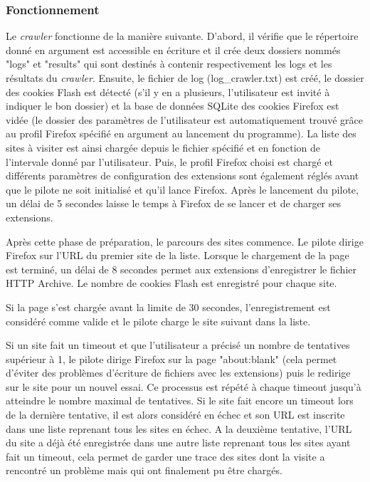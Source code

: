 \subsubsection{Fonctionnement}
Le \textit{crawler} fonctionne de la manière suivante. D'abord, il vérifie que le répertoire donné en argument est accessible en écriture et il crée deux dossiers nommés "logs" et "results" qui sont destinés à contenir respectivement les logs et les résultats du \textit{crawler}. Ensuite, le fichier de log (log\_crawler.txt) est créé, le dossier des cookies Flash est détecté (s'il y en a plusieurs, l'utilisateur est invité à indiquer le bon dossier) et la base de données SQLite des cookies Firefox est vidée (le dossier des paramètres de l'utilisateur est automatiquement trouvé grâce au profil Firefox spécifié en argument au lancement du programme). La liste des sites à visiter est ainsi chargée depuis le fichier spécifié et en fonction de l'intervale donné par l'utilisateur. Puis, le profil Firefox choisi est chargé et différents paramètres de configuration des extensions sont également réglés avant que le pilote ne soit initialisé et qu'il lance Firefox. Après le lancement du pilote, un délai de 5 secondes laisse le temps à Firefox de se lancer et de charger ses extensions.
\newline

Après cette phase de préparation, le parcours des sites commence. Le pilote dirige Firefox sur l'URL du premier site de la liste. Lorsque le chargement de la page est terminé, un délai de 8 secondes permet aux extensions d'enregistrer le fichier HTTP Archive. Le nombre de cookies Flash est enregistré pour chaque site.

Si la page s'est chargée avant la limite de 30 secondes, l'enregistrement est considéré comme valide et le pilote charge le site suivant dans la liste.

Si un site fait un timeout et que l'utilisateur a précisé un nombre de tentatives supérieur à 1, le pilote dirige Firefox sur la page "about:blank" (cela permet d'éviter des problèmes d'écriture de fichiers avec les extensions) puis le redirige sur le site pour un nouvel essai. Ce processus est répété à chaque timeout jusqu'à atteindre le nombre maximal de tentatives. Si le site fait encore un timeout lors de la dernière tentative, il est alors considéré en échec et son URL est inscrite dans une liste reprenant tous les sites en échec. A la deuxième tentative, l'URL du site a déjà été enregistrée dans une autre liste reprenant tous les sites ayant fait un timeout, cela permet de garder une trace des sites dont la visite a rencontré un problème mais qui ont finalement pu être chargés. 

